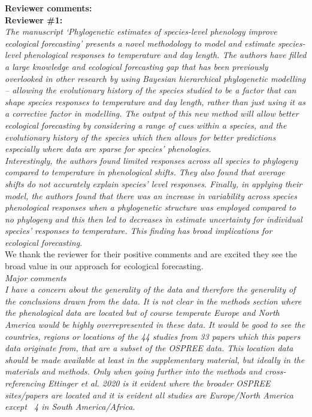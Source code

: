 \documentclass[11pt]{article}
\begin{document}
{\bf Reviewer comments:} \\

{\bf Reviewer \#1:}\\


\emph{The manuscript ‘Phylogenetic estimates of species-level phenology improve ecological forecasting’ presents a novel methodology to model and estimate species-level phenological responses to temperature and day length. The authors have filled a large knowledge and ecological forecasting gap that has been previously overlooked in other research by using Bayesian hierarchical phylogenetic modelling – allowing the evolutionary history of the species studied to be a factor that can shape species responses to temperature and day length, rather than just using it as a corrective factor in modelling. The output of this new method will allow better ecological forecasting by considering a range of cues within a species, and the evolutionary history of the species which then allows for better predictions especially where data are sparse for species’ phenologies.}\\

\emph{Interestingly, the authors found limited responses across all species to phylogeny compared to temperature in phenological shifts. They also found that average shifts do not accurately explain species’ level responses. Finally, in applying their model, the authors found that there was an increase in variability across species phenological responses when a phylogenetic structure was employed compared to no phylogeny and this then led to decreases in estimate uncertainty for individual species' responses to temperature. This finding has broad implications for ecological forecasting.}\\

We thank the reviewer for their positive comments and are excited they see the broad value in our approach for ecological forecasting.\\

\emph{Major comments}\\
\emph{I have a concern about the generality of the data and therefore the generality of the conclusions drawn from the data. It is not clear in the methods section where the phenological data are located but of course temperate Europe and North America would be highly overrepresented in these data. It would be good to see the countries, regions or locations of the 44 studies from 33 papers which this papers data originate from, that are a subset of the OSPREE data. This location data should be made available at least in the supplementary material, but ideally in the materials and methods. Only when going further into the methods and cross-referencing Ettinger et al. 2020 is it evident where the broader OSPREE sites/papers are located and it is evident all studies are Europe/North America except ~4 in South America/Africa.}\\
\end{document}

